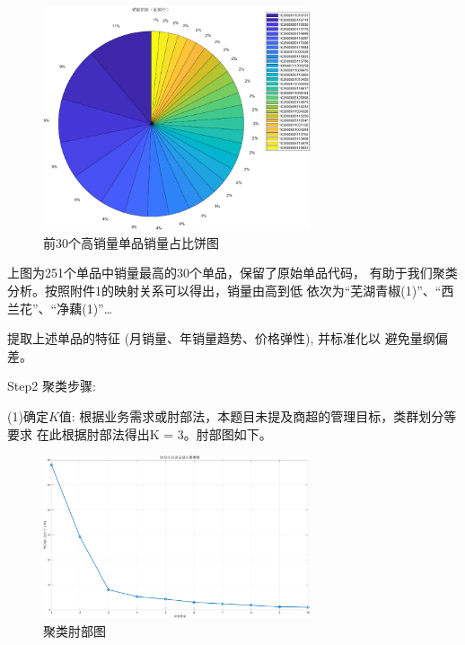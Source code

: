 \documentclass{cumcmthesis}
\begin{document}
    \begin{figure}
        
        \includegraphics[width=0.7\textwidth]{销量饼图(前30个).png} 

        \caption{前30个高销量单品销量占比饼图}

    \end{figure}
    
    上图为251个单品中销量最高的30个单品，保留了原始单品代码，
    有助于我们聚类分析。按照附件1的映射关系可以得出，销量由高到低
    依次为“芜湖青椒(1)”、“西兰花”、“净藕(1)”\dots


    提取上述单品的特征 (月销量、年销量趋势、价格弹性), 并标准化以
    避免量纲偏差。

    Step2 聚类步骤: 
    
    (1)确定$K$值: 根据业务需求或肘部法，本题目未提及商超的管理目标，类群划分等要求
    在此根据肘部法得出K = 3。肘部图如下。

    \begin{figure}[H]
         \centering
           \includegraphics[width=0.7\textwidth]{聚类肘部图.png}
           \caption{聚类肘部图}

    \end{figure}
\end{document}
